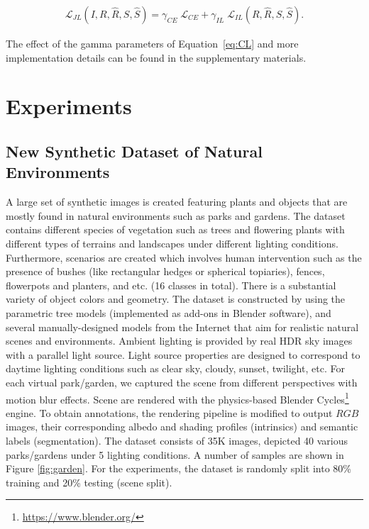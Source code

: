 \documentclass[runningheads]{llncs}
\begin{document}
\begin{equation} \label{eq:jointL}
\begin{aligned}
\mathcal{L}_{JL}(I, R, \hat{R}, S, \hat{S}) = \gamma_{CE} \; \mathcal{L}_{CE} + \gamma_{IL} \; \mathcal{L}_{IL}(R, \hat{R}, S, \hat{S}).
\end{aligned}
\end{equation}

\noindent The effect of the gamma parameters of Equation~\ref{eq:CL} and more implementation details can be found in the supplementary materials.

\section{Experiments}
\subsection{New Synthetic Dataset of Natural Environments}

A large set of synthetic images is created featuring plants and objects that are mostly found in natural environments such as parks and gardens. The dataset contains different species of vegetation such as trees and flowering plants with different types of terrains and landscapes under different lighting conditions. Furthermore, scenarios are created which involves human intervention such as the presence of bushes (like rectangular hedges or spherical topiaries), fences, flowerpots and planters, and etc. (16 classes in total). There is a substantial variety of object colors and geometry. The dataset is constructed by using the parametric tree models \cite{Weber} (implemented as 
add-ons in Blender software), and several manually-designed models from the Internet that aim for 
realistic natural scenes and environments. Ambient lighting is provided by real HDR sky images with a parallel light source. Light source properties are designed to correspond to daytime lighting conditions such as clear sky, cloudy, sunset, twilight, etc. For each virtual park/garden, we captured the scene from different perspectives with motion blur effects. Scene are rendered with the physics-based Blender Cycles\footnote{\url{https://www.blender.org/}} 
engine. To obtain annotations, the rendering pipeline is modified to output $RGB$  images, their corresponding albedo and shading profiles (intrinsics) and semantic labels (segmentation). The dataset consists of 35K images, depicted 40 various parks/gardens under 5 lighting conditions. A number of  samples are shown in Figure \ref{fig:garden}. For the experiments, the dataset is randomly split into 80\% training and 20\% testing (scene split).
\end{document}
